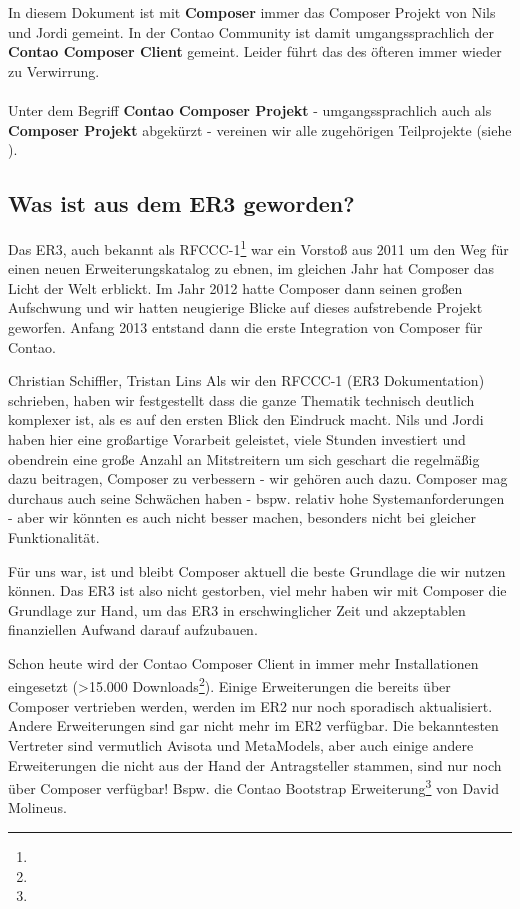 \documentclass[
paper=a4,
draft=false,%
fontsize=10pt%
]{scrartcl}
\begin{document}
\begin{info}
In diesem Dokument ist mit \textbf{Composer} immer das Composer Projekt von Nils und Jordi gemeint.
In der Contao Community ist damit umgangssprachlich der \textbf{Contao Composer Client} gemeint.
Leider führt das des öfteren immer wieder zu Verwirrung. \\
\\
Unter dem Begriff \textbf{Contao Composer Projekt} - umgangssprachlich auch als \textbf{Composer Projekt} abgekürzt - vereinen wir alle zugehörigen Teilprojekte (siehe ).
\end{info}

\subsection{Was ist aus dem ER3 geworden?}

Das ER3, auch bekannt als RFCCC-1\footnote{} war ein Vorstoß aus 2011 um den Weg für einen neuen Erweiterungskatalog zu ebnen, im gleichen Jahr hat Composer das Licht der Welt erblickt. Im Jahr 2012 hatte Composer dann seinen großen Aufschwung und wir hatten neugierige Blicke auf dieses aufstrebende Projekt geworfen. Anfang 2013 entstand dann die erste Integration von Composer für Contao.

\begin{emquote}{Christian Schiffler, Tristan Lins}
Als wir den RFCCC-1 (ER3 Dokumentation) schrieben, haben wir festgestellt dass die ganze Thematik  technisch deutlich komplexer ist, als es auf den ersten Blick den Eindruck macht. Nils und Jordi haben hier eine großartige Vorarbeit geleistet, viele Stunden investiert und obendrein eine große Anzahl an Mitstreitern um sich geschart die regelmäßig dazu beitragen, Composer zu verbessern - wir gehören auch dazu. Composer mag durchaus auch seine Schwächen haben - bspw. relativ hohe Systemanforderungen - aber wir könnten es auch nicht besser machen, besonders nicht bei gleicher Funktionalität.
\end{emquote}

Für uns war, ist und bleibt Composer aktuell die beste Grundlage die wir nutzen können. Das ER3 ist also nicht gestorben, viel mehr haben wir mit Composer die Grundlage zur Hand, um das ER3 in erschwinglicher Zeit und akzeptablen finanziellen Aufwand darauf aufzubauen.

Schon heute wird der Contao Composer Client in immer mehr Installationen eingesetzt (>15.000 Downloads\footnote{}). Einige Erweiterungen die bereits über Composer vertrieben werden, werden im ER2 nur noch sporadisch aktualisiert. Andere Erweiterungen sind gar nicht mehr im ER2 verfügbar. Die bekanntesten Vertreter sind vermutlich Avisota und MetaModels, aber auch einige andere Erweiterungen die nicht aus der Hand der Antragsteller stammen, sind nur noch über Composer verfügbar! Bspw. die Contao Bootstrap Erweiterung\footnote{} von David Molineus.
\end{document}

